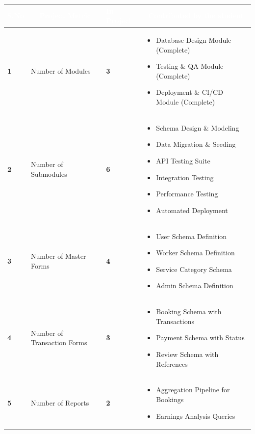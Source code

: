\documentclass[12pt,a4paper]{article}
\begin{document}
\begin{table}[h!]
\centering
\renewcommand{\arraystretch}{1.3}
\begin{tabular}{|>{\centering\arraybackslash}p{1cm}|p{4.5cm}|>{\centering\arraybackslash}p{1.5cm}|p{7.5cm}|}
\hline
\rowcolor{headerblue}
\textcolor{white}{\textbf{S.No}} & 
\multicolumn{1}{c|}{\textcolor{white}{\textbf{Project Metric}}} & 
\textcolor{white}{\textbf{In Project}} & 
\multicolumn{1}{c|}{\textcolor{white}{\textbf{Contributed by the student}}} \\
\hline
\rowcolor{lightgray}
\textbf{1} & Number of Modules & \textbf{3} & 
\begin{itemize}[nosep, leftmargin=*, topsep=0pt]
    \item Database Design Module (Complete)
    \item Testing \& QA Module (Complete)
    \item Deployment \& CI/CD Module (Complete)
\end{itemize} \\
\hline

\textbf{2} & Number of Submodules & \textbf{6} & 
\begin{itemize}[nosep, leftmargin=*, topsep=0pt]
    \item Schema Design \& Modeling
    \item Data Migration \& Seeding
    \item API Testing Suite
    \item Integration Testing
    \item Performance Testing
    \item Automated Deployment
\end{itemize} \\
\hline
\rowcolor{lightgray}
\textbf{3} & Number of Master Forms & \textbf{4} & 
\begin{itemize}[nosep, leftmargin=*, topsep=0pt]
    \item User Schema Definition
    \item Worker Schema Definition
    \item Service Category Schema
    \item Admin Schema Definition
\end{itemize} \\
\hline

\textbf{4} & Number of Transaction Forms & \textbf{3} & 
\begin{itemize}[nosep, leftmargin=*, topsep=0pt]
    \item Booking Schema with Transactions
    \item Payment Schema with Status
    \item Review Schema with References
\end{itemize} \\
\hline
\rowcolor{lightgray}
\textbf{5} & Number of Reports & \textbf{2} & 
\begin{itemize}[nosep, leftmargin=*, topsep=0pt]
    \item Aggregation Pipeline for Bookings
    \item Earnings Analysis Queries
\end{itemize} \\
\hline


\end{tabular}
\end{table}
\end{document}
